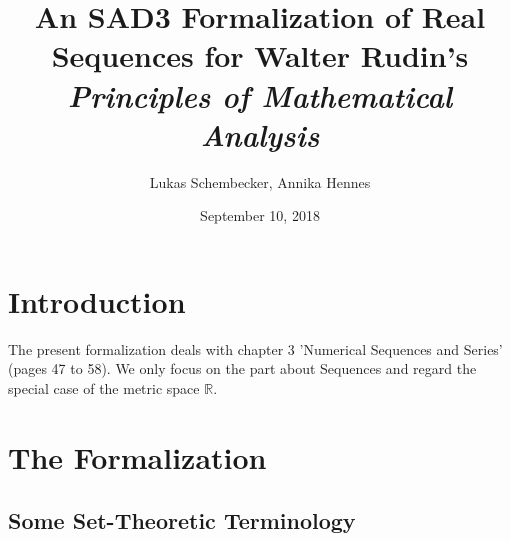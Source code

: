 \documentclass{article}
\begin{document}
\title{An SAD3 Formalization of Real Sequences for Walter Rudin's
\it{Principles of Mathematical Analysis}}

\author{Lukas Schembecker, Annika Hennes}

\date{September 10, 2018}

\maketitle


\section{Introduction}
The present formalization deals with chapter 3 'Numerical Sequences and Series' (pages 47 to 58). We only focus on the part about Sequences and regard the special case of the metric space $\mathbb{R}$.


\section{The Formalization}
\subsection{Some Set-Theoretic Terminology}
\end{document}
